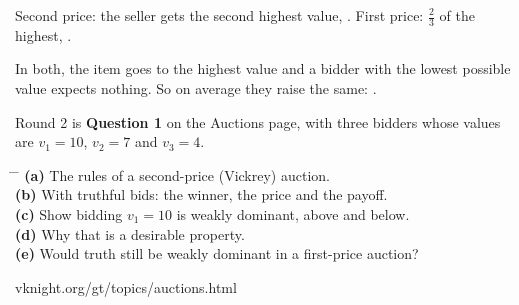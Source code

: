 \vspace{0.3cm}

{\large Second price: the seller gets the second highest value,
. \hspace{0.8cm} First price: \(\tfrac{2}{3}\) of the
highest, .}

\vspace{0.6cm}

{\large In both, the item goes to the highest value and a bidder with the
lowest possible value expects nothing. So on average they raise the same:
.}

\newpage
{}

\vspace{0.5cm}

{\large Round 2 is \textbf{Question 1} on the Auctions page, with three bidders
whose values are \(v_1 = 10\), \(v_2 = 7\) and \(v_3 = 4\).}

\vspace{0.9cm}

\hspace{0.6cm}
\begin{minipage}{0.92\linewidth}
{\large
\begin{tabbing}
\hspace{1.2cm} \= \hspace{17cm} \= \kill
\textbf{(a)} \> The rules of a second-price (Vickrey) auction. \> [3]\\[0.55em]
\textbf{(b)} \> With truthful bids: the winner, the price and the
  payoff. \> [3]\\[0.55em]
\textbf{(c)} \> Show bidding \(v_1 = 10\) is weakly dominant, above and
  below. \> [7]\\[0.55em]
\textbf{(d)} \> Why that is a desirable property. \> [4]\\[0.55em]
\textbf{(e)} \> Would truth still be weakly dominant in a first-price
  auction? \> [2]
\end{tabbing}}
\end{minipage}

\vspace{1.2cm}

\begin{center}
{\large\color{inkgrey} vknight.org/gt/topics/auctions.html}
\end{center}

\newpage
\nonotes
{}

